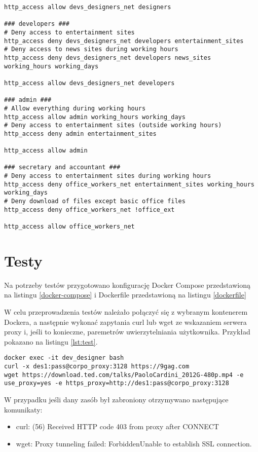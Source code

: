 \documentclass{article}
\begin{document}
\begin{lstlisting}[caption=Zmiany w pliku squid.conf \label{lst:squid-conf}]
http_access allow devs_designers_net designers

### developers ###
# Deny access to entertainment sites
http_access deny devs_designers_net developers entertainment_sites
# Deny access to news sites during working hours
http_access deny devs_designers_net developers news_sites working_hours working_days

http_access allow devs_designers_net developers

### admin ###
# Allow everything during working hours
http_access allow admin working_hours working_days
# Deny access to entertainment sites (outside working hours)
http_access deny admin entertainment_sites

http_access allow admin

### secretary and accountant ###
# Deny access to entertainment sites during working hours
http_access deny office_workers_net entertainment_sites working_hours working_days
# Deny download of files except basic office files
http_access deny office_workers_net !office_ext

http_access allow office_workers_net
\end{lstlisting}

\section{Testy}
Na potrzeby testów przygotowano konfigurację Docker Compose przedstawioną na listingu \ref{docker-compose} i Dockerfile przedstawioną na listingu \ref{dockerfile}





W celu przeprowadzenia testów należało połączyć się z wybranym kontenerem Dockera, a następnie wykonać zapytania curl lub wget ze wskazaniem serwera proxy i, jeśli to konieczne, paremetrów uwierzytelniania użytkownika.
Przykład pokazano na listingu \ref{lst:test}.

\begin{lstlisting}[caption=Przykładowy test \label{lst:test}]
docker exec -it dev_designer bash
curl -x des1:pass@corpo_proxy:3128 https://9gag.com
wget https://download.ted.com/talks/PaoloCardini_2012G-480p.mp4 -e use_proxy=yes -e https_proxy=http://des1:pass@corpo_proxy:3128
\end{lstlisting}

W przypadku jeśli dany zasób był zabroniony otrzymywano następujące komunikaty:
\begin{itemize}
    \item curl: (56) Received HTTP code 403 from proxy after CONNECT
    \item wget: Proxy tunneling failed: ForbiddenUnable to establish SSL connection.
\end{itemize}
\end{document}
